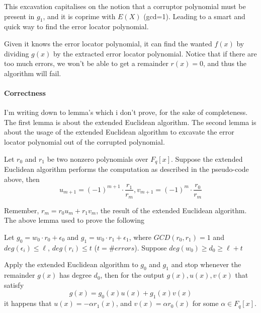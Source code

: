 This excavation capitalises on the notion that a corruptor polynomial
must be present in $g_1$, and it is coprime with $E(X)$ (gcd=1). Leading 
to a smart and quick way to find the error locator polynomial.

Given it knows the error locator polynomial, it can 
find the wanted $f(x)$ by dividing $g(x)$ by the extracted 
error locator polynomial.
Notice that if there are too much errors, we won't be able to get a remainder $r(x)=0$,
and thus the algorithm will fail.


\paragraph{Correctness}
I'm writing down to lemma's which i don't prove, for the sake of completeness.
The first lemma is about the extended Euclidean algorithm.
The second lemma is about the usage of the extended Euclidean algorithm
to excavate the error locator polynomial out of the corrupted polynomial.


\begin{lemma}
    Let $r_0$ and $r_1$ be two nonzero polynomials over $F_q[x]$.
    Suppose the extended Euclidean algorithm performs the computation as
    described in the pseudo-code above,
    then 
    $$ u_{m+1}=(-1)^{m+1}\cdot \frac{r_1}{r_m}, v_{m+1}= (-1)^{m}\cdot\frac{r_0}{r_m}$$
\end{lemma}

Remember, $r_m=r_0u_m+r_1v_m$, the result of the extended Euclidean algorithm.
The above lemma used to prove the following
\begin{lemma} 
    Let $g_0=w_0\cdot r_0+\epsilon_0$ and $g_1=w_0\cdot r_1+\epsilon_1$, where 
    $GCD(r_0,r_1)=1$ and $deg(\epsilon_i)\le\ell$, $deg(r_i)\le t$ ($t=\#errors$).
    Suppose $deg(w_0) \ge d_0 \ge \ell+t$

    Apply the extended Euclidean algorithm to $g_0$ and $g_1$  and stop whenever 
    the remainder $g(x)$ has degree $d_0$, then for the output 
    $g(x),u(x),v(x)$ that satisfy 
    $$g(x)=g_0(x)u(x)+g_1(x)v(x)$$
    it happens that $u(x)=-\alpha r_1(x)$, and $v(x)=\alpha r_0(x)$ for some 
    $\alpha\in F_q[x]$. 
\end{lemma}

